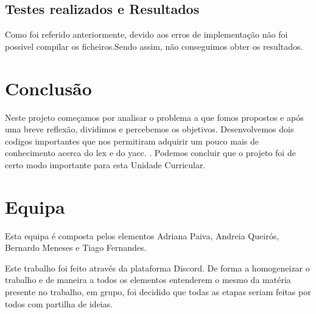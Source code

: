 \documentclass{report}
\begin{document}
\section{Testes realizados e Resultados}
Como foi referido anteriormente, devido aos erros de implementação não foi possivel compilar os ficheiros.Sendo assim, não conseguimos obter os resultados.



\chapter{Conclusão}
Neste projeto começamos por analisar o problema a que fomos propostos e após
uma breve reflexão, dividimos e percebemos os objetivos. Desenvolvemos 
dois codigos importantes que nos permitiram adquirir um pouco mais de conhecimento acerca do lex e do yacc.
. Podemos concluir que o projeto foi de certo modo importante para esta Unidade Curricular.


\appendix

\chapter{Equipa}

Esta equipa é composta pelos elementos Adriana Paiva, Andreia Queirós, Bernardo Meneses e Tiago Fernandes. 

Este trabalho foi feito através da plataforma Discord. De forma a homogeneizar o trabalho e de maneira a todos os elementos entenderem o mesmo da matéria presente no trabalho, em grupo, foi decidido que todas as etapas seriam feitas por todos com partilha de ideias.



\newpage
\end{document}
